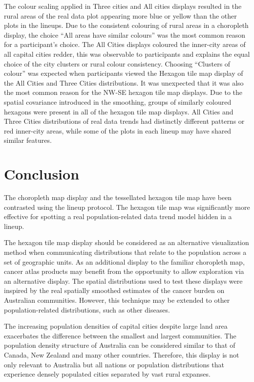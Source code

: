 \documentclass[times, doublespace]{anzsauth}
\begin{document}
The colour scaling applied in Three cities and All cities displays
resulted in the rural areas of the real data plot appearing more blue or
yellow than the other plots in the lineups. Due to the consistent
colouring of rural areas in a choropleth display, the choice ``All areas
have similar colours'' was the most common reason for a participant's choice.
The All Cities displays coloured the inner-city areas of all capital
cities redder, this was observable to participants and explains the
equal choice of the city clusters or rural colour consistency. Choosing
``Clusters of colour'' was expected when participants viewed the Hexagon
tile map display of the All Cities and Three Cities distributions. It
was unexpected that it was also the most common reason for the NW-SE
hexagon tile map displays. Due to the spatial covariance introduced in
the smoothing, groups of similarly coloured hexagons were present in all
of the hexagon tile map displays. All Cities and Three Cities
distributions of real data trends had distinctly different patterns or
red inner-city areas, while some of the plots in each lineup may have
shared similar features.

\section{Conclusion}\label{conclusion}

The choropleth map display and the tessellated hexagon tile map have
been contrasted using the lineup protocol. The hexagon tile map was
significantly more effective for spotting a real population-related data
trend model hidden in a lineup.

The hexagon tile map display should be considered as an alternative
visualization method when communicating distributions that relate to the
population across a set of geographic units. As an additional display to
the familiar choropleth map, cancer atlas products may benefit from the
opportunity to allow exploration via an alternative display. The spatial
distributions used to test these displays were inspired by the real
spatially smoothed estimates of the cancer burden on Australian
communities. However, this technique may be extended to other population-related distributions, such as other diseases.

The increasing population densities of capital cities despite large land
area exacerbates the difference between the smallest and largest communities.
The population density structure of Australia can be considered similar
to that of Canada, New Zealand and many other countries. Therefore, this
display is not only relevant to Australia but all nations or population
distributions that experience densely populated cities separated by vast
rural expanses.
\end{document}
